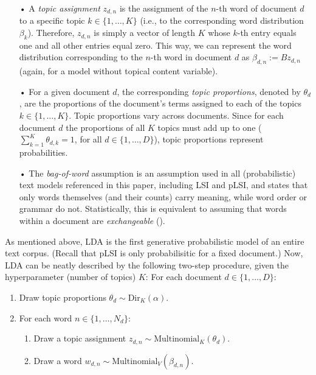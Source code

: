 \documentclass[12pt]{article}
\begin{document}
\begin{itemize}
\vspace{-0.25cm}
\item[•] A \textit{topic assignment} $z_{d,n}$ is the assignment of the $n$-th word of document $d$ to a specific topic $k \in \{1,\dots,K\}$ (i.e., to the corresponding word distribution $\beta_k$). Therefore, $z_{d,n}$ is simply a vector of length $K$ whose $k$-th entry equals one and all other entries equal zero. This way, we can represent the word distribution corresponding to the $n$-th word in document $d$ as $\beta_{d,n}:=Bz_{d,n}$ (again, for a model without topical content variable).
\vspace{-0.25cm}
\item[•] For a given document $d$, the corresponding \textit{topic proportions}, denoted by $\theta_d$, are the proportions of the document's terms assigned to each of the topics $k \in \{1,\dots,K\}$. Topic proportions vary across documents. Since for each document $d$ the proportions of all $K$ topics must add up to one ($\sum_{k=1}^{K}\theta_{d,k}=1$, for all $d \in \{1,\dots,D\}$), topic proportions represent probabilities.
\vspace{-0.25cm}
\item[•] The \textit{bag-of-word} assumption is an assumption used in all (probabilistic) text models referenced in this paper, including LSI and pLSI, and states that only words themselves (and their counts) carry meaning, while word order or grammar do not. Statistically, this is equivalent to assuming that words within a document are \textit{exchangeable} (\citealp{aldous1985exchangeability}).

\end{itemize}

As mentioned above, LDA is the first generative probabilistic model of an entire text corpus. (Recall that pLSI is only probabilisitic for a fixed document.) Now, LDA can be neatly described by the following two-step procedure, given the hyperparameter (number of topics) $K$:
\vspace{0.25cm}
\noindent
For each document $d \in \{1,\dots,D\}$:

\begin{enumerate}[{1)}]
\vspace{-0.25cm}
\item Draw topic proportions $\theta_d \sim \text{Dir}_K(\alpha)$.
\vspace{-0.25cm}
\item For each word $n \in \{1,\dots,N_d\}$:
	\begin{enumerate}[{a)}]
	\vspace{-0.25cm}    
    \item Draw a topic assignment $z_{d,n} \sim \text{Multinomial}_K(\theta_d)$.
	\vspace{-0.25cm}    
    \item Draw a word $w_{d,n} \sim \text{Multinomial}_V(\beta_{d,n})$.
	\end{enumerate}
\end{enumerate}
\end{document}

